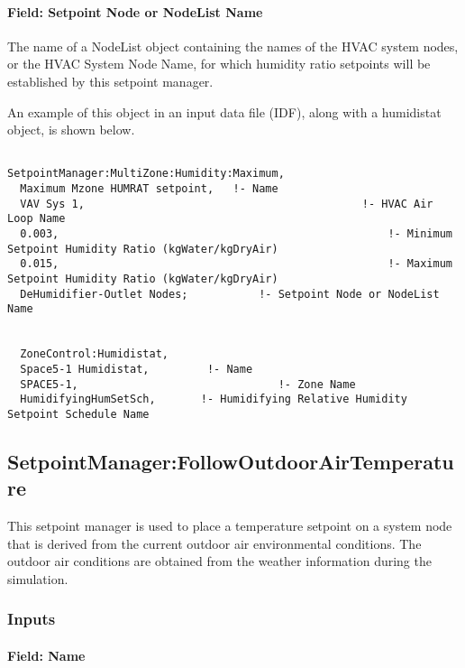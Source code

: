 \paragraph{Field: Setpoint Node or NodeList Name}\label{field-setpoint-node-or-nodelist-name-18}

The name of a NodeList object containing the names of the HVAC system nodes, or the HVAC System Node Name, for which humidity ratio setpoints will be established by this setpoint manager.

An example of this object in an input data file (IDF), along with a humidistat object, is shown below.

\begin{lstlisting}

SetpointManager:MultiZone:Humidity:Maximum,
  Maximum Mzone HUMRAT setpoint,   !- Name
  VAV Sys 1,                                           !- HVAC Air Loop Name
  0.003,                                                   !- Minimum Setpoint Humidity Ratio (kgWater/kgDryAir)
  0.015,                                                   !- Maximum Setpoint Humidity Ratio (kgWater/kgDryAir)
  DeHumidifier-Outlet Nodes;           !- Setpoint Node or NodeList Name


  ZoneControl:Humidistat,
  Space5-1 Humidistat,         !- Name
  SPACE5-1,                               !- Zone Name
  HumidifyingHumSetSch,       !- Humidifying Relative Humidity Setpoint Schedule Name
\end{lstlisting}

\subsection{SetpointManager:FollowOutdoorAirTemperature}\label{setpointmanagerfollowoutdoorairtemperature}

This setpoint manager is used to place a temperature setpoint on a system node that is derived from the current outdoor air environmental conditions. The outdoor air conditions are obtained from the weather information during the simulation.

\subsubsection{Inputs}\label{inputs-20-005}

\paragraph{Field: Name}\label{field-name-20-002}

